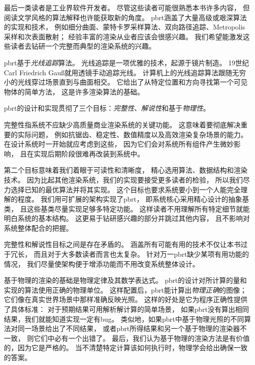 最后一类读者是工业界软件开发者。
尽管这些读者可能很熟悉本书许多内容，
但阅读文学风格的算法解释也许能获取新的角度。
pbrt涵盖了大量高级或艰深算法的实现和技术，
例如细分曲面、蒙特卡罗采样算法、双向路径追踪、Metropolis采样和次表面散射；
经验丰富的渲染从业者应该会很感兴趣。
我们希望能激发这些读者去钻研一个完整而典型的渲染系统的兴趣。\\


pbrt基于{\itshape 光线追踪}算法。
光线追踪是一项优雅的技术，起源于镜片制造。
19世纪Carl Friedrich Gau{\ss}就用透镜手动追踪光线。
计算机上的光线追踪算法跟随无穷小的光线穿过场景直到与曲面相交。
它给出了从特定位置和方向寻找第一个可见物体的简单方法，
这是许多渲染算法的基础。

pbrt的设计和实现贯彻了三个目标：{\itshape 完整性}、{\itshape 解说性}和基于{\itshape 物理性}。

完整性指系统不应缺少高质量商业渲染系统的关键功能。
这意味着要彻底解决重要的实际问题，
例如抗锯齿、稳定性、数值精度以及高效渲染复杂场景的能力。
在设计系统时一开始就应考虑到这些，
因为它们会对系统所有组件产生微妙影响，
且在实现后期阶段很难再改装到系统中。

第二个目标意味着我们着眼于可读性和清晰度，
精心选用算法、数据结构和渲染技术。
因为比起其他渲染系统，我们的实现要接受更多读者的检验，
所以我们尽力选择已知的最优算法并将其实现。
这个目标也要求系统要小到一个人能完全理解的程度。
我们用可扩展的架构实现了pbrt，
即系统核心采用精心设计的抽象基类，
且这些基类尽量实现足够多特定功能。
这样读者不用理解所有特定细节就能明白系统的基本结构。
这更易于钻研感兴趣的部分并跳过其他内容，
且不影响对系统整体配合的把握。

完整性和解说性目标之间是存在矛盾的。
涵盖所有可能有用的技术不仅让本书过于冗长，
而且对于大多数读者而言也太复杂。
针对万一pbrt缺少某项有用功能的情况，
我们尽量使架构便于增添功能而不用改变系统整体设计。

基于物理的渲染的基础是物理定律及其数学表达式。
pbrt的设计对所计算的量和实现的算法使用正确的物理单位。
这样配置后，pbrt能计算出{\itshape 物理正确}的图像；
它们像在真实世界场景中那样准确反映光照。
这样的好处是它为程序正确性提供了具体标准：
对于预期结果可用解析解计算的简单场景，
如果pbrt没有算出相同结果，我们就能知道实现一定有bug。
类似地，如果pbrt中基于物理光照的不同算法对同一场景给出了不同结果，
或者pbrt所得结果和另一个基于物理的渲染器不一致，
则它们中必有一个出错了。
最后，我们认为基于物理的渲染方法是有价值的，因为它是严格的。
当不清楚特定计算该如何执行时，物理学会给出确保一致的答案。

